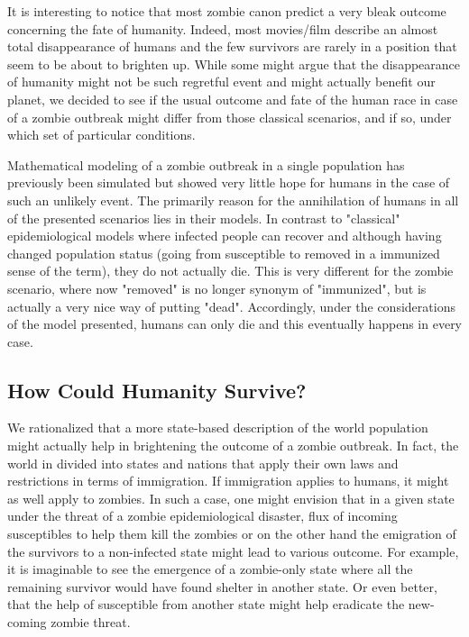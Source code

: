 \documentclass[11pt]{article} %
\begin{document}
It is interesting to notice that most zombie canon predict a very bleak outcome concerning the fate of humanity. Indeed, most movies/film describe an almost total disappearance of humans and the few survivors are rarely in a position that seem to be about to brighten up. While some might argue that the disappearance of humanity might not be such regretful event and might actually benefit our planet, we decided to see if the usual outcome and fate of the human race in case of a zombie outbreak might differ from those classical scenarios, and if so, under which set of particular conditions. 

Mathematical modeling of a zombie outbreak in a single population has previously been simulated \cite{munz2009zombies} but showed very little hope for humans in the case of such an unlikely event. The primarily reason for the annihilation of humans in all of the presented scenarios lies in their models. In contrast to "classical" epidemiological models where infected people can recover and although having changed population status (going from susceptible to removed in a immunized sense of the term), they do not actually die. This is very different for the zombie scenario, where now "removed" is no longer synonym of "immunized", but is actually a very nice way of putting "dead". Accordingly, under the considerations of the model presented, humans can only die and this eventually happens in every case.\\

\subsection{How Could Humanity Survive?}\indent

We rationalized that a more state-based description of the world population might actually help in brightening the outcome of a zombie outbreak. In fact, the world in divided into states and nations that apply their own laws and restrictions in terms of immigration. If immigration applies to humans, it might as well apply to zombies. In such a case, one might envision that in a given state under the threat of a zombie epidemiological disaster, flux of incoming susceptibles to help them kill the zombies or on the other hand the emigration of the survivors to a non-infected state might lead to various outcome. For example, it is imaginable to see the emergence of a zombie-only state where all the remaining survivor would have found shelter in another state. Or even better, that the help of susceptible from another state might help eradicate the new-coming zombie threat. 
\end{document}
